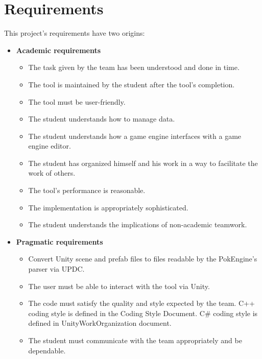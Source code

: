 \documentclass[12pt,a4paper]{article}
\begin{document}
\section{Requirements}
This project’s requirements have two origins:
\begin{itemize}
	\item \textbf{Academic requirements}
		\begin{itemize}
			\item The task given by the team has been understood and done in time.
			
			\item The tool is maintained by the student after the tool's completion.
			
			\item The tool must be user-friendly.
			
			\item The student understands how to manage data.
			
			\item The student understands how a game engine interfaces with a game engine editor.
			
			\item The student has organized himself and his work in a way to facilitate the work of others.
			
			\item The tool’s performance is reasonable.
			
			\item The implementation is appropriately sophisticated.
			
			\item The student understands the implications of non-academic teamwork.
			
		\end{itemize}
	\item \textbf{Pragmatic requirements}
		\begin{itemize}
			\item Convert Unity scene and prefab files to files readable by the PokEngine's parser via UPDC.
			
			\item The user must be able to interact with the tool via Unity.
			
			\item The code must satisfy the quality and style expected by the team. C++ coding style is defined in the Coding Style Document. C\# coding style is defined in UnityWorkOrganization document.
			
			\item The student must communicate with the team appropriately and be dependable.
			
	\end{itemize}
\end{itemize}
\end{document}
